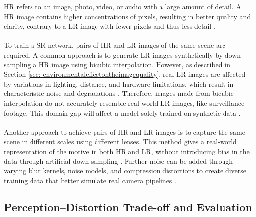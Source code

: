 \acf{HR} refers to an image, photo, video, or audio with a large amount of detail. A \acs{HR} image contains higher concentrations of pixels, resulting in better quality and clarity, contrary to a \acs{LR} image with fewer pixels and thus less detail \cite{HRvsLR}. 
\\\\
To train a \acs{SR} network, pairs of \acs{HR} and \acs{LR} images of the same scene are required. A common approach is to generate \acs{LR} images synthetically by down-sampling a \acs{HR} image using bicubic interpolation. However, as described in Section \ref{sec: environmentaleffectontheimagequality}, real \acs{LR} images are affected by variations in lighting, distance, and hardware limitations, which result in characteristic noise and degradations \cite{Cai2019RealSR,Wei2020DRealSR}. Therefore, images made from bicubic interpolation do not accurately resemble real world \acs{LR} images, like surveillance footage. This domain gap will affect a model solely trained on synthetic data \cite{Agustsson2017NTIRE,Timofte2017NTIRE}.
\\\\
Another approach to achieve pairs of \acs{HR} and \acs{LR} images is to capture the same scene in different scales using different lenses. This method gives a real-world representation of the motive in both \acs{HR} and \acs{LR}, without introducing bias in the data through artificial down-sampling \cite{Cai2019RealSR,Wei2020DRealSR}. Further noise can be added through varying blur kernels, noise models, and compression distortions to create diverse training data that better simulate real camera pipelines \cite{Wang2021RealESRGAN}.

\subsection{Perception–Distortion Trade-off and Evaluation}
\label{subsec:perception-distortion-tradeoff}

